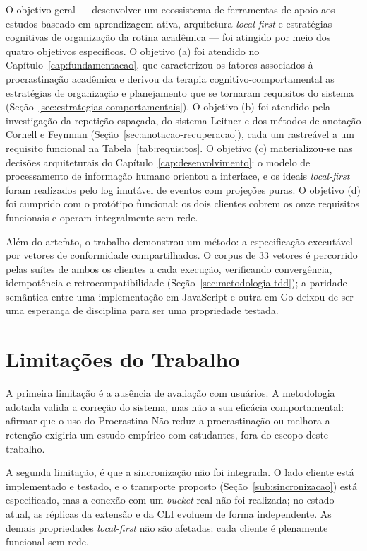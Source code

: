 \documentclass[12pt, %
openright, 
oneside,
a4paper,
english,   %
brazil]{facom-ufu-abntex2}
\begin{document}
O objetivo geral --- desenvolver um ecossistema de ferramentas de apoio aos
estudos baseado em aprendizagem ativa, arquitetura \textit{local-first} e
estratégias cognitivas de organização da rotina acadêmica --- foi atingido
por meio dos quatro objetivos específicos. O objetivo (a) foi atendido no
Capítulo~\ref{cap:fundamentacao}, que caracterizou os fatores associados à
procrastinação acadêmica e derivou da terapia cognitivo-comportamental as
estratégias de organização e planejamento que se tornaram requisitos do
sistema (Seção~\ref{sec:estrategias-comportamentais}). O objetivo (b) foi
atendido pela investigação da repetição espaçada, do sistema Leitner e dos
métodos de anotação Cornell e Feynman
(Seção~\ref{sec:anotacao-recuperacao}), cada um rastreável a um requisito
funcional na Tabela~\ref{tab:requisitos}. O objetivo (c) materializou-se nas
decisões arquiteturais do Capítulo~\ref{cap:desenvolvimento}: o modelo de
processamento de informação humano orientou a interface, e os ideais
\textit{local-first} foram realizados pelo log imutável de eventos com
projeções puras. O objetivo (d) foi cumprido com o protótipo funcional: os
dois clientes cobrem os onze requisitos funcionais e operam integralmente
sem rede.

Além do artefato, o trabalho demonstrou um método: a especificação executável
por vetores de conformidade compartilhados. O corpus de 33 vetores é
percorrido pelas suítes de ambos os clientes a cada execução, verificando
convergência, idempotência e retrocompatibilidade
(Seção~\ref{sec:metodologia-tdd}); a paridade semântica entre uma
implementação em JavaScript e outra em Go deixou de ser uma esperança de
disciplina para ser uma propriedade testada.

\section{Limitações do Trabalho}

A primeira limitação é a ausência de avaliação com usuários. A metodologia
adotada valida a correção do sistema, mas não a sua eficácia comportamental:
afirmar que o uso do Procrastina Não reduz a procrastinação ou melhora a retenção
exigiria um estudo empírico com estudantes, fora do escopo deste trabalho.

A segunda limitação, é que a sincronização não foi integrada. O lado cliente
está implementado e testado, e o transporte proposto
(Seção~\ref{sub:sincronizacao}) está especificado, mas a conexão com um
\textit{bucket} real não foi realizada; no estado atual, as réplicas da
extensão e da CLI evoluem de forma independente. As demais propriedades
\textit{local-first} não são afetadas: cada cliente é plenamente funcional
sem rede.
\end{document}
